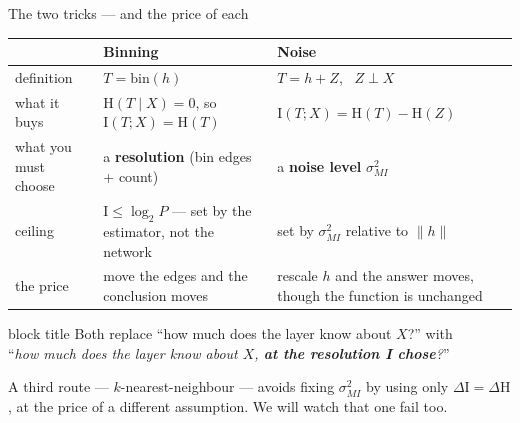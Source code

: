 \documentclass[aspectratio=169,11pt]{beamer}
\newcommand{\I}{\mathrm{I}}
\newcommand{\HH}{\mathrm{H}}
\newcommand{\smi}{\sigma_{MI}}
\begin{document}
\begin{frame}{The two tricks --- and the price of each}
\centering\footnotesize
\begin{tabular}{@{}p{3.1cm}p{4.3cm}p{4.6cm}@{}}
\toprule
 & \textbf{Binning} & \textbf{Noise} \\
\midrule
definition & $T=\mathrm{bin}(h)$ & $T = h + Z$, \ $Z\perp X$ \\[3pt]
what it buys &
  $\HH(T\mid X)=0$, so $\I(T;X)=\HH(T)$ &
  $\I(T;X)=\HH(T)-\HH(Z)$ \\[3pt]
what you must choose &
  a \textbf{resolution} (bin edges + count) &
  a \textbf{noise level} $\smi^2$ \\[3pt]
ceiling &
  $\I \le \log_2 P$ --- set by the estimator, not the network &
  set by $\smi^2$ relative to $\|h\|$ \\[3pt]
\textcolor{bad}{the price} &
  \textcolor{bad}{move the edges and the conclusion moves} &
  \textcolor{bad}{rescale $h$ and the answer moves, though the function is unchanged} \\
\bottomrule
\end{tabular}
\medskip
\begin{beamercolorbox}[sep=4pt,center,rounded=true]{block title}
\small Both replace ``how much does the layer know about $X$?'' with\\
``\emph{how much does the layer know about $X$, \textbf{at the resolution I chose}?}''
\end{beamercolorbox}
\smallskip
{\footnotesize\centering
A third route --- $k$-nearest-neighbour --- avoids fixing $\smi^2$ by using only
$\Delta\I=\Delta\HH$, at the price of a different assumption. We will watch that one
fail too.\par}
\end{frame}
\end{document}
